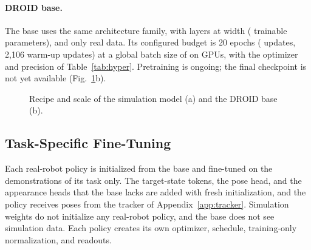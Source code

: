 \paragraph{DROID base.} The base uses the same architecture family, with
\cfgBaseLayers{} layers at width \cfgWidth{} (\cfgBaseParams{} trainable
parameters), and only real data. Its configured budget is 20 epochs
(\cfgBaseUpdates{} updates, 2{,}106 warm-up updates) at a global batch size of
\cfgBatch{} on \cfgBaseGPUs{} GPUs, with the optimizer and precision of
Table~\ref{tab:hyper}. Pretraining is ongoing; the final checkpoint is not yet available
(Fig.~\ref{fig:scaling}b).

\begin{figure}[t]
\centering
{}
\caption{Recipe and scale of the simulation model (a) and the DROID base (b).}
\label{fig:scaling}
\end{figure}

\subsection{Task-Specific Fine-Tuning}
\label{app:posttraining}
Each real-robot policy is initialized from the base and fine-tuned on the
demonstrations of its task only. The target-state tokens, the pose head, and the
appearance heads that the base lacks are added with fresh initialization, and the
policy receives poses from the tracker of Appendix~\ref{app:tracker}. Simulation
weights do not initialize any real-robot policy, and the base does not see
simulation data. Each policy creates its own optimizer, schedule, training-only
normalization, and readouts.
